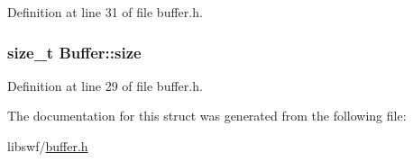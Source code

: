 Definition at line 31 of file buffer.\+h.

\hypertarget{struct_buffer_a24e94f119f4b386771c78cf37aaff41b}{}
\subsubsection[{size}]{\setlength{\rightskip}{0pt plus 5cm}size\+\_\+t Buffer\+::size}\label{struct_buffer_a24e94f119f4b386771c78cf37aaff41b}


Definition at line 29 of file buffer.\+h.



The documentation for this struct was generated from the following file\+:\begin{DoxyCompactItemize}
\item 
libswf/\hyperlink{buffer_8h}{buffer.\+h}\end{DoxyCompactItemize}
